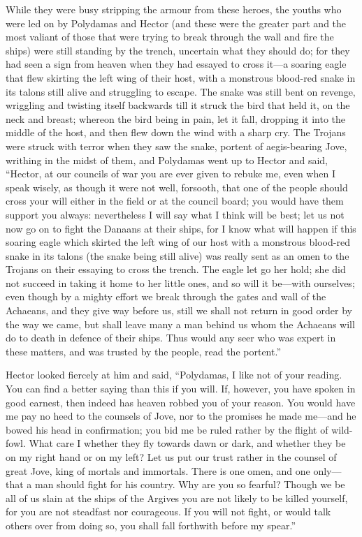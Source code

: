While they were busy stripping the armour from these heroes, the youths
who were led on by Polydamas and Hector (and these were the greater part
and the most valiant of those that were trying to break through the wall
and fire the ships) were still standing by the trench, uncertain what they
should do; for they had seen a sign from heaven when they had essayed to
cross it—a soaring eagle that flew skirting the left wing of their
host, with a monstrous blood-red snake in its talons still alive and
struggling to escape. The snake was still bent on revenge, wriggling and
twisting itself backwards till it struck the bird that held it, on the
neck and breast; whereon the bird being in pain, let it fall, dropping it
into the middle of the host, and then flew down the wind with a sharp cry.
The Trojans were struck with terror when they saw the snake, portent of
aegis-bearing Jove, writhing in the midst of them, and Polydamas went up
to Hector and said, “Hector, at our councils of war you are ever given to
rebuke me, even when I speak wisely, as though it were not well, forsooth,
that one of the people should cross your will either in the field or at
the council board; you would have them support you always: nevertheless I
will say what I think will be best; let us not now go on to fight the
Danaans at their ships, for I know what will happen if this soaring eagle
which skirted the left wing of our host with a monstrous blood-red snake
in its talons (the snake being still alive) was really sent as an omen to
the Trojans on their essaying to cross the trench. The eagle let go her
hold; she did not succeed in taking it home to her little ones, and so
will it be—with ourselves; even though by a mighty effort we break
through the gates and wall of the Achaeans, and they give way before us,
still we shall not return in good order by the way we came, but shall
leave many a man behind us whom the Achaeans will do to death in defence
of their ships. Thus would any seer who was expert in these matters, and
was trusted by the people, read the portent.”

Hector looked fiercely at him and said, “Polydamas, I like not of your
reading. You can find a better saying than this if you will. If, however,
you have spoken in good earnest, then indeed has heaven robbed you of your
reason. You would have me pay no heed to the counsels of Jove, nor to the
promises he made me—and he bowed his head in confirmation; you bid
me be ruled rather by the flight of wild-fowl. What care I whether they
fly towards dawn or dark, and whether they be on my right hand or on my
left? Let us put our trust rather in the counsel of great Jove, king of
mortals and immortals. There is one omen, and one only—that a man
should fight for his country. Why are you so fearful? Though we be all of
us slain at the ships of the Argives you are not likely to be killed
yourself, for you are not steadfast nor courageous. If you will not fight,
or would talk others over from doing so, you shall fall forthwith before
my spear.”

